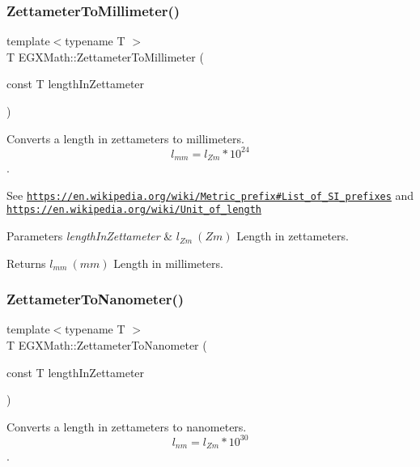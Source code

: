 \subsubsection{\texorpdfstring{Zettameter\+To\+Millimeter()}{ZettameterToMillimeter()}}
{\footnotesize\ttfamily template$<$typename T $>$ \\
T E\+G\+X\+Math\+::\+Zettameter\+To\+Millimeter (\begin{DoxyParamCaption}\item[{const T}]{length\+In\+Zettameter }\end{DoxyParamCaption})}



Converts a length in zettameters to millimeters. \[ l_{mm}=l_{Zm} * 10^{24} \]. 

See \href{https://en.wikipedia.org/wiki/Metric_prefix#List_of_SI_prefixes}{\tt https\+://en.\+wikipedia.\+org/wiki/\+Metric\+\_\+prefix\#\+List\+\_\+of\+\_\+\+S\+I\+\_\+prefixes} and \href{https://en.wikipedia.org/wiki/Unit_of_length}{\tt https\+://en.\+wikipedia.\+org/wiki/\+Unit\+\_\+of\+\_\+length} 
\begin{DoxyParams}{Parameters}
{\em length\+In\+Zettameter} & $ l_{Zm}\ (Zm)$ Length in zettameters. \\
\hline
\end{DoxyParams}
\begin{DoxyReturn}{Returns}
$ l_{mm}\ (mm)$ Length in millimeters. 
\end{DoxyReturn}
\mbox{\label{group___e_g_x_math-_conversions-_length_conversions-_s_i-_zettameter-_s_i_ga07934308bcd823e960e1c4be504e5afd}} 
\subsubsection{\texorpdfstring{Zettameter\+To\+Nanometer()}{ZettameterToNanometer()}}
{\footnotesize\ttfamily template$<$typename T $>$ \\
T E\+G\+X\+Math\+::\+Zettameter\+To\+Nanometer (\begin{DoxyParamCaption}\item[{const T}]{length\+In\+Zettameter }\end{DoxyParamCaption})}



Converts a length in zettameters to nanometers. \[ l_{nm}=l_{Zm} * 10^{30} \]. 

